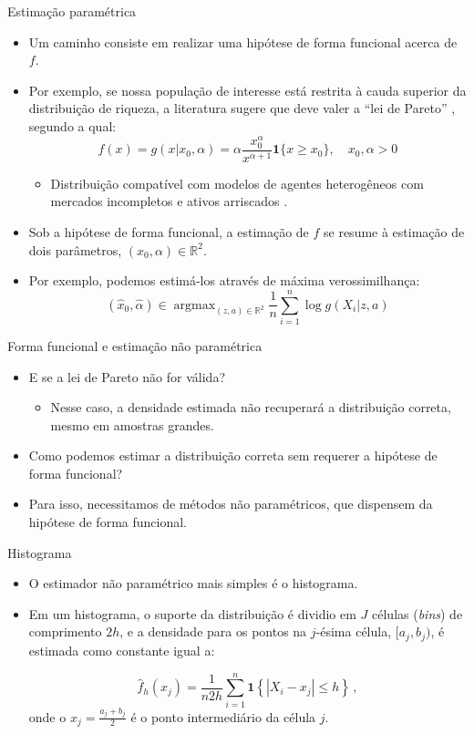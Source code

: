 \documentclass[11pt]{beamer}
\begin{document}
	\begin{frame}{Estimação paramétrica}
		\begin{itemize}
			\item Um caminho consiste em realizar uma {\color{blue}hipótese de forma funcional} acerca de $f$.
			\item Por exemplo, se nossa população de interesse está restrita à cauda superior da distribuição de riqueza, a literatura sugere que deve valer a ``lei de Pareto'' \citep{benhabib2018skewed}, segundo a qual:
			$$f(x) = g(x|x_0,\alpha) = \alpha \frac{x_0^{\alpha}}{x^{\alpha+1}}\mathbf{1}\{x\geq x_0\}, \quad x_0,\alpha>0$$
			 \begin{itemize}
			 	\item Distribuição compatível com modelos de agentes heterogêneos com mercados incompletos e ativos arriscados \citep{achdou2022income}.
			 \end{itemize}
			 \item Sob a hipótese de forma funcional, a estimação de $f$ se resume à estimação de dois parâmetros, $(x_0,\alpha)\in \mathbb{R}^2$.
			 \item Por exemplo, podemos estimá-los através de máxima verossimilhança:
			 $$(\hat x_0, \hat \alpha) \in \operatorname{argmax}_{(z,a)\in \mathbb{R}^2} \frac{1}{n}\sum_{i=1}^n \log g(X_i|z,a)$$
		\end{itemize}
	\end{frame}
	\begin{frame}{Forma funcional e estimação não paramétrica}
		\begin{itemize}
			\item E se a lei de Pareto não for válida?
			\begin{itemize}
				\item Nesse caso, a densidade estimada não recuperará a distribuição correta, mesmo em amostras grandes.
			\end{itemize}
			\item Como podemos estimar a distribuição correta sem requerer a hipótese de forma funcional?
			\item Para isso, necessitamos de métodos {\color{blue}não paramétricos}, que dispensem da hipótese de forma funcional.
		\end{itemize}
	\end{frame}
	\begin{frame}{Histograma}
		\begin{itemize}
			\item O estimador não paramétrico mais simples é o histograma.
			\item Em um histograma, o suporte da distribuição é dividio em $J$ células (\textit{bins}) de comprimento $2h$, e a densidade para os pontos na $j$-ésima célula, $[a_j,b_j)$, é estimada como constante igual a:
			
			$$\hat{f}_h(x_j) = \frac{1}{n2h}\sum_{i=1}^n \mathbf{1}\left\{|X_i-x_j|\leq h\right\}\,,$$ 
			onde o $x_j = \frac{a_j+b_j}{2}$  é o ponto intermediário da célula $j$.
		\end{itemize}
	\end{frame}
\end{document}
